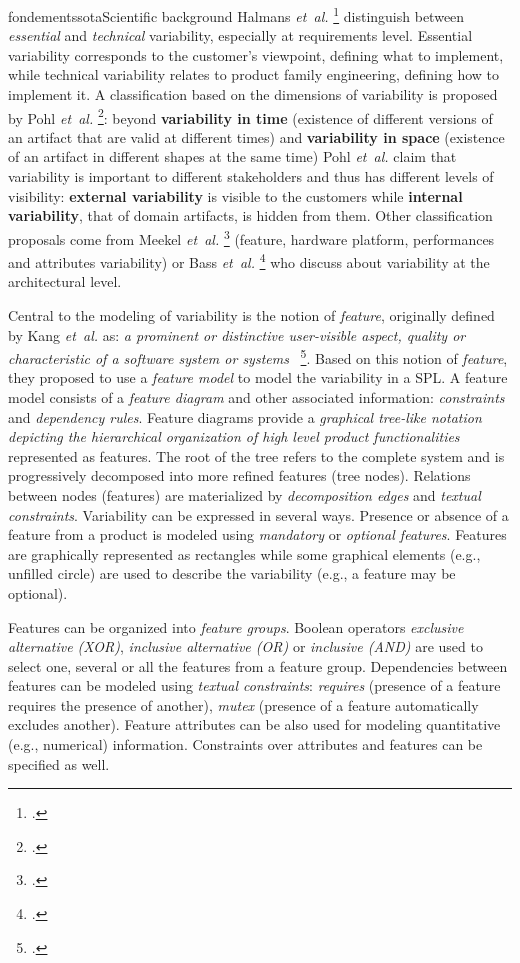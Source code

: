 \documentclass{ra2018}
\begin{document}
\begin{module}{fondements}{sota}{Scientific background}
Halmans \textit{et~al.}   \footcite{halmans2003} distinguish between \textit{essential} and
\textit{technical} variability, especially at requirements level. Essential
variability corresponds to the customer's viewpoint, defining what to
implement, while technical variability relates to product family engineering,
defining how to implement it. A classification based on the dimensions of
variability is proposed by Pohl \textit{et~al.}   \footcite{Pohl2005}: beyond
\textbf{variability in time} (existence of different versions of an artifact
that are valid at different times) and \textbf{variability in space}
(existence of an artifact in different shapes at the same time) Pohl \textit{et~al.} claim that variability is important to different stakeholders and thus has
different levels of visibility: \textbf{external variability} is visible to
the customers while \textbf{internal variability}, that of domain artifacts,
is hidden from them. Other classification proposals come from Meekel \textit{et~al.}   \footcite{Meekel1998} (feature, hardware platform, performances and attributes
variability) or Bass \textit{et~al.}   \footcite{Bachmann2001} who discuss about variability
at the architectural level.


Central to the modeling of variability is the notion of \textit{feature},
originally defined by Kang \textit{et~al.} as: \textit{a prominent or distinctive user-visible
aspect, quality or characteristic of a software system or
systems}~  \footcite{Kang1990}. Based on this notion of \textit{feature}, they proposed to use a
\textit{feature model} to model the variability in a SPL. A
feature model consists of a \textit{feature diagram} and other associated
information: \textit{constraints} and \textit{dependency rules}. Feature
diagrams provide a \textit{graphical tree-like notation depicting the
hierarchical organization of high level product functionalities} represented
as features. The root of the tree refers to the complete system and is
progressively decomposed into more refined features (tree nodes). Relations
between nodes (features) are materialized by \textit{decomposition edges} and
\textit{textual constraints}. Variability can be expressed in several
ways. Presence or absence of a feature from a product is modeled using
\textit{mandatory} or \textit{optional features}. Features are graphically
represented as rectangles while some graphical elements (e.g., unfilled
circle) are used to describe the variability (e.g., a feature may be
optional).

Features can be organized into \textit{feature groups}. Boolean operators
\textit{exclusive alternative (XOR)}, \textit{inclusive alternative (OR)} or
\textit{inclusive (AND)} are used to select one, several or all the features
from a feature group. Dependencies between features can be modeled using
\textit{textual constraints}: \textit{requires} (presence of a feature requires
the presence of another), \textit{mutex} (presence of a feature automatically
excludes another). Feature attributes can be also used for modeling quantitative (e.g., numerical) information. 
Constraints over attributes and features can be specified as well. 


\end{module}
\end{document}
